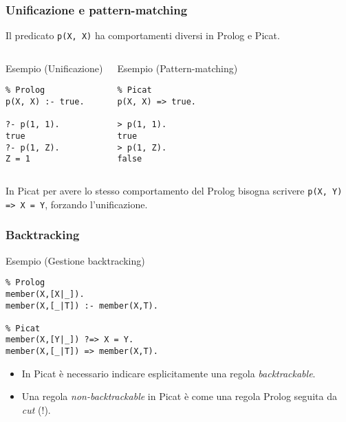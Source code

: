 \documentclass{beamer}
\begin{document}
\begin{frame}[fragile]
  \frametitle{Unificazione e pattern-matching}
  
  Il predicato \texttt{p(X, X)} ha comportamenti diversi in Prolog e
  Picat.
  \begin{columns}[c]
    
    \begin{exampleblock}{Esempio (Unificazione)}
\begin{verbatim}
% Prolog
p(X, X) :- true.

?- p(1, 1).
true
?- p(1, Z).
Z = 1
\end{verbatim}
    \end{exampleblock}
    
    \begin{exampleblock}{Esempio (Pattern-matching)}
\begin{verbatim}
% Picat
p(X, X) => true.

> p(1, 1).
true
> p(1, Z).
false
\end{verbatim}
    \end{exampleblock}
  \end{columns}

  \medskip

  In Picat per avere lo stesso comportamento del Prolog bisogna
  scrivere \texttt{p(X, Y) => X = Y}, forzando l'unificazione.
\end{frame}


\begin{frame}[fragile]
  \frametitle{Backtracking}
  
  \begin{exampleblock}{Esempio (Gestione backtracking)}
\begin{verbatim}
% Prolog 
member(X,[X|_]).
member(X,[_|T]) :- member(X,T).

% Picat
member(X,[Y|_]) ?=> X = Y.
member(X,[_|T]) => member(X,T).
\end{verbatim}
  \end{exampleblock}

  \begin{itemize}
  \item In Picat è necessario indicare esplicitamente una regola
    \emph{backtrackable}.
  \item Una regola \emph{non-backtrackable} in Picat è come una regola
    Prolog seguita da \emph{cut} (!).
  \end{itemize}
  
\end{frame}
\end{document}

